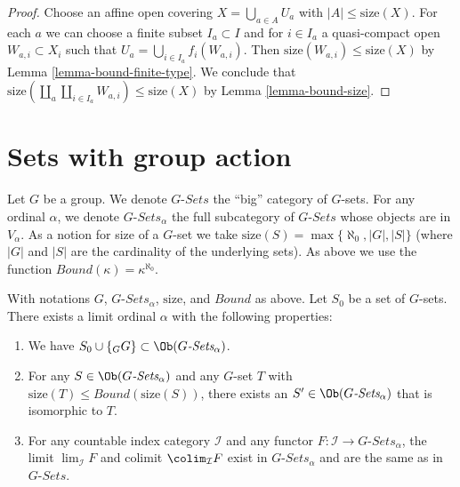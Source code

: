 \begin{proof}
Choose an affine open covering $X = \bigcup_{a \in A} U_a$ with
$|A| \leq \text{size}(X)$. For each $a$ we can choose
a finite subset $I_a \subset I$ and for $i \in I_a$ a quasi-compact open
$W_{a, i} \subset X_i$ such that $U_a = \bigcup_{i \in I_a} f_i(W_{a, i})$.
Then $\text{size}(W_{a, i}) \leq \text{size}(X)$ by
Lemma \ref{lemma-bound-finite-type}.
We conclude that
$\text{size}(\coprod_a \coprod_{i \in I_a} W_{a, i}) \leq \text{size}(X)$
by Lemma \ref{lemma-bound-size}.
\end{proof}





\section{Sets with group action}
\label{section-sets-with-group-action}

\noindent
Let $G$ be a group. We denote $G\textit{-Sets}$ the ``big'' category
of $G$-sets. For any ordinal $\alpha$, we denote
$G\textit{-Sets}_\alpha$ the full subcategory of $G\textit{-Sets}$
whose objects are in $V_\alpha$. As a notion for size of a $G$-set
we take $\text{size}(S) = \max\{\aleph_0, |G|, |S|\}$ (where $|G|$ and
$|S|$ are the cardinality of the underlying sets). As above we use the function
$Bound(\kappa) = \kappa^{\aleph_0}$.

\begin{lemma}
\label{lemma-sets-with-group-action}
With notations $G$, $G\textit{-Sets}_\alpha$, $\text{size}$,
and $Bound$ as above. Let $S_0$ be a set of $G$-sets.
There exists a limit ordinal $\alpha$ with the following properties:
\begin{enumerate}
\item We have $S_0 \cup \{{}_GG\} \subset \Ob(G\textit{-Sets}_\alpha)$.
\item For any $S \in \Ob(G\textit{-Sets}_\alpha)$ and any
$G$-set $T$ with $\text{size}(T) \leq Bound(\text{size}(S))$,
there exists an $S' \in \Ob(G\textit{-Sets}_\alpha)$
that is isomorphic to $T$.
\item For any countable index category $\mathcal{I}$ and
any functor $F : \mathcal{I} \to G\textit{-Sets}_\alpha$, the
limit $\lim_\mathcal{I} F$ and colimit
$\colim_\mathcal{I} F$ exist in $G\textit{-Sets}_\alpha$
and are the same as in $G\textit{-Sets}$.
\end{enumerate}
\end{lemma}

